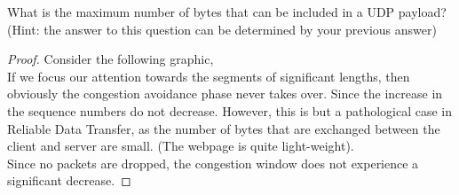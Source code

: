 \documentclass[../../main.tex]{subfiles}
\begin{document}
\begin{wts}
What is the maximum number of bytes that can be included in a UDP payload?  (Hint: the answer to this question can be determined by your previous answer) 
\end{wts}

\begin{proof}
    Consider the following graphic,\\
    If we focus our attention towards the segments of significant lengths, then obviously the congestion avoidance phase never takes over. Since the increase in the sequence numbers do not decrease. However, this is but a pathological case in Reliable Data Transfer, as the number of bytes that are exchanged between the client and server are small. (The webpage is quite light-weight).\\
    
    Since no packets are dropped, the congestion window does not experience a significant decrease.
\end{proof}
\end{document}
